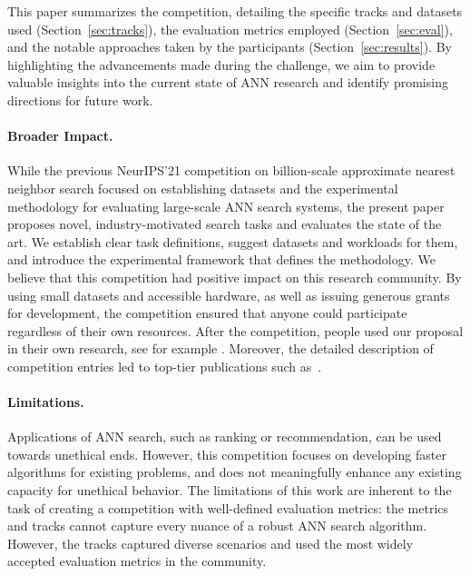 This paper summarizes the competition, detailing the specific tracks and datasets used (Section~\ref{sec:tracks}),
the evaluation metrics employed (Section~\ref{sec:eval}), and the notable approaches taken by the participants (Section~\ref{sec:results}). 
By highlighting the advancements made during the challenge, we aim to provide valuable insights 
into the current state of ANN research and identify promising directions for future work.


\paragraph{Broader Impact.}  
While the previous NeurIPS’21 competition on billion-scale approximate nearest neighbor search \cite{DBLP:conf/nips/SimhadriWADBBCH21} focused on establishing datasets and the experimental methodology for evaluating large-scale ANN search systems, the present paper proposes novel, industry-motivated search tasks and evaluates the state of the art. We establish clear task definitions, suggest datasets and workloads for them, and introduce the experimental framework that defines the methodology. 
We believe that this competition had positive impact on this research community.
By using small datasets and accessible hardware, as well as issuing generous grants for development, the competition ensured that anyone could participate regardless of their own resources.
After the competition, people used our proposal in their own research, see for example \cite{DBLP:conf/sigir/BruchNRV24,DBLP:journals/debu/KrishnaswamyMS24,DBLP:journals/corr/abs-2502-13826,DBLP:journals/corr/abs-2502-13245,upreti2025costeffectivelowlatencyvector}.
Moreover, the detailed description of competition entries led to top-tier publications such as~\cite{DBLP:journals/pvldb/ChenZHJW24}.

\paragraph{Limitations.}
Applications of ANN search, such as ranking or recommendation, can be used towards unethical ends.
However, this competition focuses on developing faster algorithms for existing problems,
and does not meaningfully enhance any existing capacity for unethical behavior. The limitations of this work are inherent to the task of creating a competition with well-defined evaluation metrics: 
the metrics and tracks cannot capture every nuance of a robust ANN search algorithm. 
However, the tracks captured diverse scenarios and used the most widely accepted evaluation
metrics in the community.
